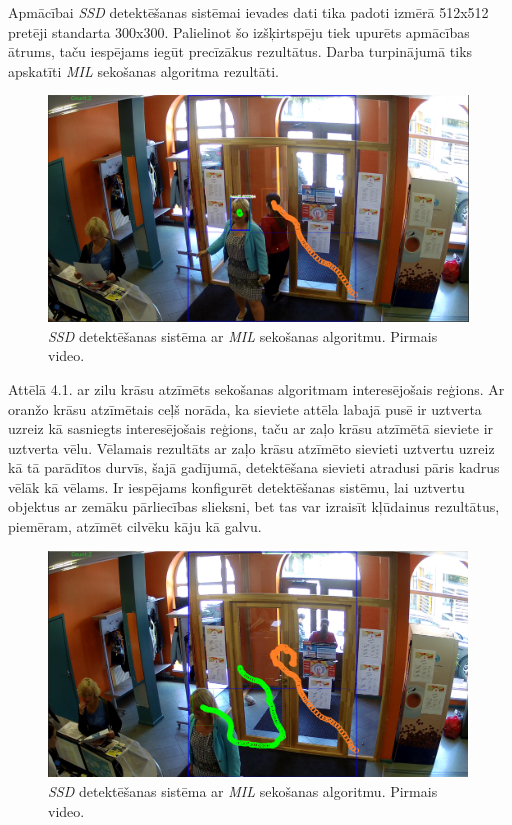 Apmācībai \textit{SSD} detektēšanas sistēmai ievades dati tika padoti izmērā 512x512 pretēji standarta 300x300. Palielinot šo izšķirtspēju tiek upurēts apmācības ātrums, taču iespējams iegūt precīzākus rezultātus. Darba turpinājumā tiks apskatīti \textit{MIL} sekošanas algoritma rezultāti. 
 
\begin{figure}[h]%
	\centering
	\includegraphics[height=6cm]{images/ssd1.png} %
	\caption{\textit{SSD} detektēšanas sistēma ar \textit{MIL} sekošanas algoritmu. Pirmais video.}%
	\label{fig:example}%
\end{figure}
\newpage
Attēlā 4.1. ar zilu krāsu atzīmēts sekošanas algoritmam interesējošais reģions. Ar oranžo krāsu atzīmētais ceļš norāda, ka sieviete attēla labajā pusē ir uztverta uzreiz kā sasniegts interesējošais reģions, taču ar zaļo krāsu atzīmētā sieviete ir uztverta vēlu. Vēlamais rezultāts ar zaļo krāsu atzīmēto sievieti uztvertu uzreiz kā tā parādītos durvīs, šajā gadījumā, detektēšana sievieti atradusi pāris kadrus vēlāk kā vēlams. Ir iespējams konfigurēt detektēšanas sistēmu, lai uztvertu objektus ar zemāku pārliecības slieksni, bet tas var izraisīt kļūdainus rezultātus, piemēram, atzīmēt cilvēku kāju kā galvu.

\begin{figure}[h]%
	\centering
	\includegraphics[height=6cm]{images/ssd2.png} %
	\caption{\textit{SSD} detektēšanas sistēma ar \textit{MIL} sekošanas algoritmu. Pirmais video.}%
	\label{fig:example}%
\end{figure}

